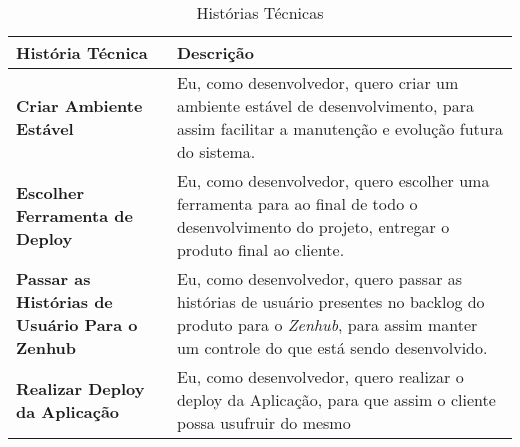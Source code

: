 \begin{table}[H]
	\begin{tabular}{|p{5.0cm}|p{10.0cm}|} 
	\hline
	\textbf{História Técnica} & \textbf{Descrição} \\ \hline
	\textbf{Criar Ambiente Estável} & Eu, como desenvolvedor, quero criar um ambiente estável de desenvolvimento, para assim facilitar a manutenção e evolução futura do sistema. \\ \hline
	\textbf{Escolher Ferramenta de Deploy} & Eu, como desenvolvedor, quero escolher uma ferramenta para ao final de todo o desenvolvimento do projeto, entregar o produto final ao cliente. \\ \hline
	\textbf{Passar as Histórias de Usuário Para o Zenhub} & Eu, como desenvolvedor, quero passar as histórias de usuário presentes no backlog do produto para o \textit{Zenhub}, para assim manter um controle do que está sendo desenvolvido. \\ \hline
	\textbf{Realizar Deploy da Aplicação} & Eu, como desenvolvedor, quero realizar o deploy da Aplicação, para que assim o cliente possa usufruir do mesmo \\ \hline
	\end{tabular}
	 \caption{Histórias Técnicas}
	 \label{tab:historias_tecnicas}
\end{table}